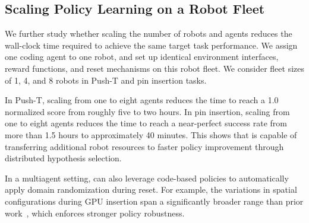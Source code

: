 \subsection{Scaling Policy Learning on a Robot Fleet}
We further study whether scaling the number of robots and agents reduces the wall-clock time required to achieve the same target task performance. We assign one coding agent to one robot, and set up identical environment interfaces, reward functions, and reset mechanisms on this robot fleet. We consider fleet sizes of 1, 4, and 8 robots in Push-T and pin insertion tasks. 

In Push-T, scaling from one to eight agents reduces the time to reach a 1.0 normalized score from roughly five to two hours. In pin insertion, scaling from one to eight agents reduces the time to reach a near-perfect success rate from more than 1.5 hours to approximately 40 minutes.
This shows that \method is capable of transferring additional robot resources to faster policy improvement through distributed hypothesis selection. 


In a multiagent setting, \method can also leverage code-based policies to automatically apply domain randomization during reset. For example, the variations in spatial configurations during GPU insertion span a significantly broader range than prior work~\citep{pld}, which enforces stronger policy robustness. 




